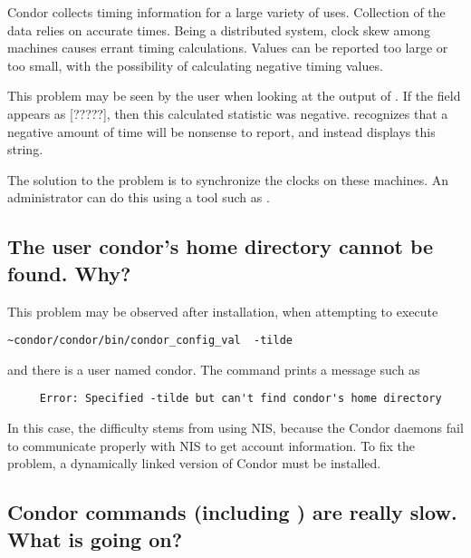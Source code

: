 Condor collects timing information for a large variety of uses.
Collection of the data relies on accurate times.
Being a distributed system, clock skew among machines causes 
errant timing calculations.
Values can be reported too large or too small, with the possibility
of calculating negative timing values.

This problem may be seen by the user when looking at the output
of .
If the  field appears
as [?????],
then this calculated statistic was negative.
 recognizes that a negative amount of time will
be nonsense to report, and instead displays this string. 

The solution to the problem is to synchronize the clocks on
these machines.
An administrator can do this using a tool such as .

\subsection*{The user condor's home directory cannot be found.  Why?}

This problem may be observed after installation, when attempting
to execute
\footnotesize
\begin{verbatim}
~condor/condor/bin/condor_config_val  -tilde
\end{verbatim}
\normalsize
and there is a user named condor.
The command prints a message such as
\footnotesize
\begin{verbatim}
     Error: Specified -tilde but can't find condor's home directory
\end{verbatim}
\normalsize

In this case, the difficulty stems from 
using NIS,
because the Condor daemons fail to communicate properly with NIS to get
account information.
To fix the problem, a dynamically linked version of Condor must
be installed.

\subsection*{Condor commands (including ) are really slow. What is going on?}

